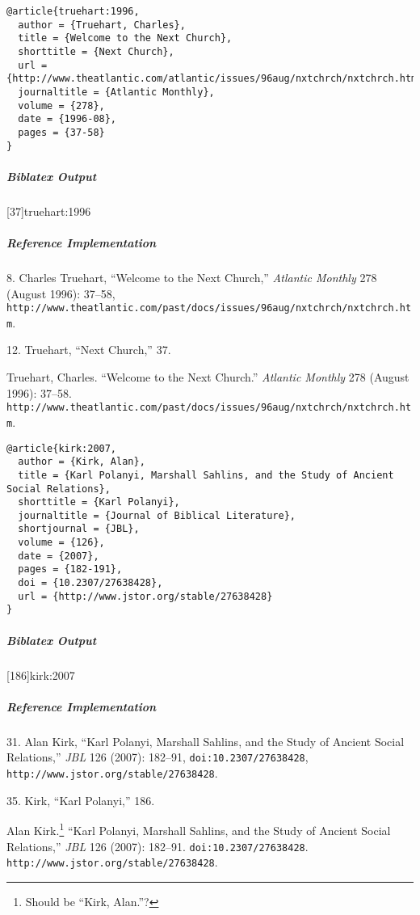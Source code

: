 \documentclass[a4paper]{article}
\newenvironment{biboutput}{%
  \subparagraph{Biblatex Output}
}{\color{black}}
\newenvironment{refimp}{%
  \subparagraph{Reference Implementation}
  \color{reference-colour}
  \rm
}{\par\color{black}}
\begin{document}
\begin{lstlisting}
@article{truehart:1996,
  author = {Truehart, Charles},
  title = {Welcome to the Next Church},
  shorttitle = {Next Church},
  url = {http://www.theatlantic.com/atlantic/issues/96aug/nxtchrch/nxtchrch.htm},
  journaltitle = {Atlantic Monthly},
  volume = {278},
  date = {1996-08},
  pages = {37-58}
}
\end{lstlisting}

\begin{biboutput}
  [37]{truehart:1996}
\end{biboutput}

\begin{refimp}
  8. Charles Truehart, “Welcome to the Next Church,” \emph{Atlantic Monthly}
  278 (August 1996): 37–58,
  \nolinkurl{http://www.theatlantic.com/past/docs/issues/96aug/nxtchrch/nxtchrch.htm}.

  12. Truehart, “Next Church,” 37.
 
  \sloppy\hangindent\bibindent Truehart, Charles. “Welcome to the Next Church.”
  \emph{Atlantic Monthly} 278 (August 1996): 37–58.
  \nolinkurl{http://www.theatlantic.com/past/docs/issues/96aug/nxtchrch/nxtchrch.htm}.
\end{refimp}

\begin{lstlisting}
@article{kirk:2007,
  author = {Kirk, Alan},
  title = {Karl Polanyi, Marshall Sahlins, and the Study of Ancient Social Relations},
  shorttitle = {Karl Polanyi},
  journaltitle = {Journal of Biblical Literature},
  shortjournal = {JBL},
  volume = {126},
  date = {2007},
  pages = {182-191},
  doi = {10.2307/27638428},
  url = {http://www.jstor.org/stable/27638428}
}
\end{lstlisting}

\begin{biboutput}
  [186]{kirk:2007}
\end{biboutput}

\begin{refimp}
  31. Alan Kirk, “Karl Polanyi, Marshall Sahlins, and the Study of Ancient Social
  Relations,” \emph{JBL} 126 (2007): 182–91, \nolinkurl{doi:10.2307/27638428},
  \nolinkurl{http://www.jstor.org/stable/27638428}.

  35. Kirk, “Karl Polanyi,” 186.

  \hangindent\bibindent Alan Kirk.\footnote{Should be “Kirk, Alan.”?} “Karl
  Polanyi, Marshall Sahlins, and the Study of Ancient Social Relations,”
  \emph{JBL} 126 (2007): 182–91. \nolinkurl{doi:10.2307/27638428}.
  \nolinkurl{http://www.jstor.org/stable/27638428}.

\end{refimp}
\end{document}
